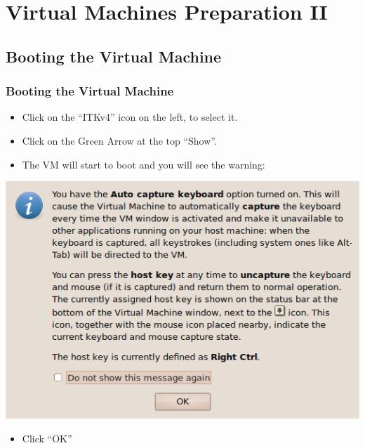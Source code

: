 \section{Virtual Machines Preparation II}


\subsection{Booting the Virtual Machine}
\begin{frame}
\frametitle{Booting the Virtual Machine}
\begin{itemize}
\item Click on the ``ITKv4'' icon on the left, to select it.
\item Click on the Green Arrow at the top ``Show''.
\item The VM will start to boot and you will see the warning:
\end{itemize}
\begin{center}
  \includegraphics[width=0.4\paperwidth]{../Art/Screenshot-VirtualBox-OSE-02.png}
\end{center}
\begin{itemize}
\item Click ``OK''
\end{itemize}
\end{frame}

